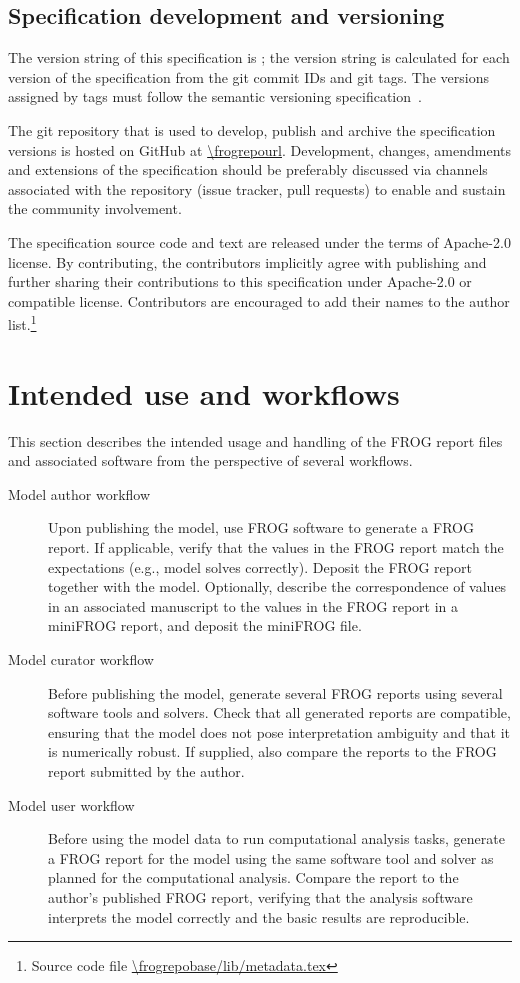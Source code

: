\subsection{Specification development and versioning}

The version string of this specification is \texttt{\frogspecversion}; the version string is calculated for each version of the specification from the git commit IDs and git tags.
The versions assigned by tags must follow the semantic versioning specification~\cite{semver}.

The git repository that is used to develop, publish and archive the specification versions is hosted on GitHub at \url{\frogrepourl}.
Development, changes, amendments and extensions of the specification should be preferably discussed via channels associated with the repository (issue tracker, pull requests) to enable and sustain the community involvement.

The specification source code and text are released under the terms of Apache-2.0 license.
By contributing, the contributors implicitly agree with publishing and further sharing their contributions to this specification under Apache-2.0 or compatible license.
Contributors are encouraged to add their names to the author list.\footnote{Source code file \url{\frogrepobase/lib/metadata.tex}}

\section{Intended use and workflows}

This section describes the intended usage and handling of the FROG report files and associated software from the perspective of several workflows.

\begin{description}
\item[Model author workflow] Upon publishing the model, use FROG software to generate a FROG report.
If applicable, verify that the values in the FROG report match the expectations (e.g., model solves correctly).
Deposit the FROG report together with the model.
Optionally, describe the correspondence of values in an associated manuscript to the values in the FROG report in a miniFROG report, and deposit the miniFROG file.
\item[Model curator workflow] Before publishing the model, generate several FROG reports using several software tools and solvers.
Check that all generated reports are compatible, ensuring that the model does not pose interpretation ambiguity and that it is numerically robust.
If supplied, also compare the reports to the FROG report submitted by the author.
\item[Model user workflow] Before using the model data to run computational analysis tasks, generate a FROG report for the model using the same software tool and solver as planned for the computational analysis.
Compare the report to the author's published FROG report, verifying that the analysis software interprets the model correctly and the basic results are reproducible.
\end{description}

